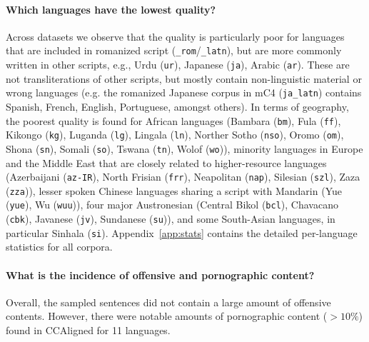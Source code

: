 \paragraph{Which languages have the lowest quality?} Across datasets we observe that the quality is particularly poor for languages that are included in romanized script (\texttt{\_rom}/\texttt{\_latn}), but are more commonly written in other scripts, e.g., Urdu (\texttt{ur}), Japanese (\texttt{ja}), Arabic (\texttt{ar}).
These are not transliterations of other scripts, but mostly contain non-linguistic material or wrong languages (e.g. the romanized Japanese corpus in mC4 (\texttt{ja\_latn}) contains Spanish, French, English, Portuguese, amongst others). %
In terms of geography, the poorest quality is found for African languages (Bambara (\texttt{bm}), Fula (\texttt{ff}), Kikongo (\texttt{kg}), Luganda (\texttt{lg}), Lingala (\texttt{ln}), Norther Sotho (\texttt{nso}), Oromo (\texttt{om}), Shona (\texttt{sn}), Somali (\texttt{so}), Tswana (\texttt{tn}), Wolof (\texttt{wo})), minority languages in Europe and the Middle East that are closely related to higher-resource languages (Azerbaijani (\texttt{az-IR}), North Frisian (\texttt{frr}), Neapolitan (\texttt{nap}), Silesian (\texttt{szl}), Zaza (\texttt{zza})), lesser spoken Chinese languages sharing a script with Mandarin (Yue (\texttt{yue}), Wu (\texttt{wuu})), four major Austronesian (Central Bikol (\texttt{bcl}), Chavacano (\texttt{cbk}), Javanese (\texttt{jv}), Sundanese (\texttt{su})), and some South-Asian languages, in particular Sinhala (\texttt{si}).
Appendix~\ref{app:stats} contains the detailed per-language statistics for all corpora.

\paragraph{What is the incidence of offensive and pornographic content?}
Overall, the sampled sentences did not contain a large amount of offensive contents. However, there were notable amounts of pornographic content ($>10\%$) found in CCAligned for 11 languages. %


